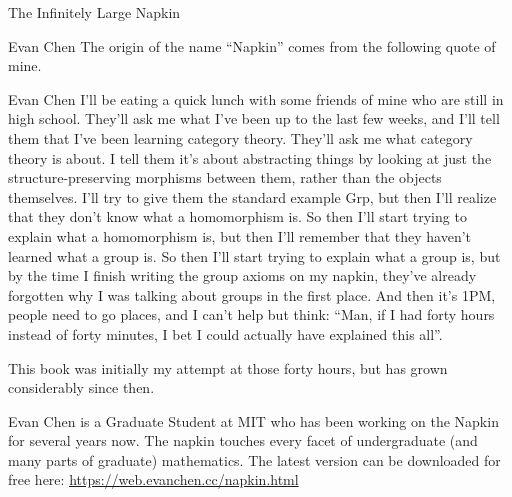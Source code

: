 \begin{boxResource}{The Infinitely Large Napkin}
\begin{boxQuote}{Evan Chen}
The origin of the name “Napkin” comes from the following quote of mine.
    \begin{boxQuote}{Evan Chen}
        I’ll be eating a quick lunch with some friends of mine who are still in high school.  They’ll ask me what I’ve been up to the last few weeks, and I’ll tell them that I’ve been learning category theory. They’ll ask me what category theory is about. I tell them it’s about abstracting things by looking at just the structure-preserving morphisms between them, rather than the objects themselves. I’ll try to give them the standard example Grp, but then I’ll realize that they don’t know what a homomorphism is.  So then I’ll start trying to explain what a homomorphism is, but then I’ll remember that they haven’t learned what a group is. So then I’ll start trying to explain what a group is, but by the time I finish writing the group axioms on my napkin, they’ve already forgotten why I was talking about groups in the first place. And then it’s 1PM, people need to go places, and I can’t help but think: “Man, if I had forty hours instead of forty minutes, I bet I could actually have explained this all”.
    \end{boxQuote}
This book was initially my attempt at those forty hours, but has grown considerably since then.
\end{boxQuote}
\tcblower
Evan Chen is a Graduate Student at MIT who has been working on the Napkin for several years now.
The napkin touches every facet of undergraduate (and many parts of graduate) mathematics.
The latest version can be downloaded for free here: \url{https://web.evanchen.cc/napkin.html}
\end{boxResource}
